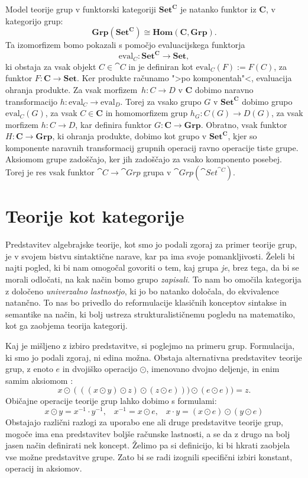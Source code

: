\documentclass[../kategoricna_logika.tex]{subfiles}
\begin{document}
% 
\begin{primer}
  Model teorije grup v funktorski kategoriji $\mathbf{Set}^{\mathbf{C}}$ je
  natanko funktor iz $\mathbf{C}$, v kategorijo grup:
  \[ \mathbf{Grp}(\mathbf{Set}^{\mathbf{C}}) \cong \mathbf{Hom}(\mathbf{C}, \mathbf{Grp}). \]
  Ta izomorfizem bomo pokazali s pomočjo evaluacijskega funktorja
  \[ \mathrm{eval}_C : \mathbf{Set}^{\mathbf{C}} \to \mathbf{Set}, \]
  ki obstaja za vsak objekt $C \in \cat{C}$ in je definiran kot
  $\mathrm{eval}_{C}(F) := F(C)$, za funktor $F : \mathbf{C} \to \mathbf{Set}$.
  Ker produkte računamo ">po komponentah"<, evaluacija ohranja produkte.
  Za vsak morfizem~${h : C \to D}$ v $\mathbf{C}$ dobimo naravno
  transformacijo $h : \mathrm{eval}_{C} \to \mathrm{eval}_{D}$.
  Torej za vsako grupo $G$ v $\mathbf{Set}^{\mathbf{C}}$ dobimo grupo
  $\mathrm{eval}_{C}(G)$, za vsak $C \in \mathbf{C}$ in homomorfizem grup
  $h_{G} : C(G) \to D(G)$, za vsak morfizem $h : C \to D$,
  kar definira funktor $G : \mathbf{C} \to \mathbf{Grp}$.
  Obratno, vsak funktor $H : \mathbf{C} \to \mathbf{Grp}$, ki ohranja produkte,
  dobimo kot grupo v $\mathbf{Set}^{\mathbf{C}}$, kjer so komponente
  naravnih transformacij grupnih operacij ravno operacije tiste grupe.
  Aksiomom grupe zadoščajo, ker jih zadoščajo za vsako komponento posebej.
  Torej je res vsak funktor $\cat{C} \to \cat{Grp}$ grupa v $\cat{Grp}(\cat{Set}^{\cat{C}})$.
\end{primer}
%
\section{Teorije kot kategorije}
\label{sec:teorije-kot-kategorije}
Predstavitev algebrajske teorije, kot smo jo podali zgoraj za primer
teorije grup, je v svojem bistvu sintaktične narave, kar pa ima
svoje pomankljivosti.
Želeli bi najti pogled, ki bi nam omogočal govoriti o tem,
kaj grupa \emph{je}, brez tega, da bi se morali odločati,
na kak način bomo grupo \emph{zapisali}.
To nam bo omočila kategorija z določeno \emph{univerzalno lastnostjo},
ki jo bo natanko določala, do ekvivalence natančno.
To nas bo privedlo do reformulacije klasičnih konceptov
sintakse in semantike na način, ki bolj ustreza strukturalističnemu pogledu na matematiko,
kot ga zaobjema teorija kategorij.

Kaj je mišljeno z izbiro predstavitve, si poglejmo na primeru grup.
Formulacija, ki smo jo podali zgoraj, ni edina možna.
Obstaja alternativna predstavitev teorije grup,
z enoto $e$ in dvojiško operacijo $\odot$,
imenovano dvojno deljenje, in enim samim aksiomom \cite{mccune1993single}:
$$x \odot (((x \odot y ) \odot z ) \odot ( z \odot e))) \odot (e \odot e) ) = z.$$
Običajne operacije teorije grup lahko dobimo s formulami:
$$x \odot y = x^{-1} \cdot y^{-1} \text{,} \quad x^{-1} = x \odot e \text{,} \quad x \cdot y = (x \odot e) \odot (y \odot e)$$
%
Obstajajo različni razlogi za uporabo ene ali druge predstavitve
teorije grup, mogoče ima ena predstavitev boljše računske lastnosti,
a se da z drugo na bolj jasen način definirati nek koncept.
Želimo pa si definicijo, ki bi hkrati zaobjela vse možne predstavitve grupe.
Zato bi se radi izognili specifični izbiri konstant, operacij in aksiomov.
\end{document}
